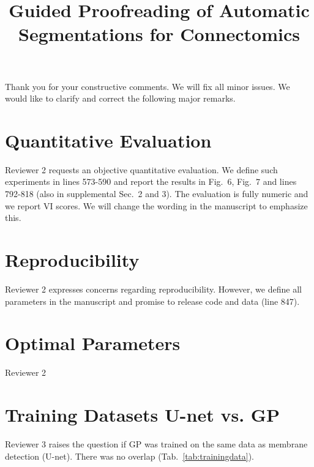 \documentclass[10pt,twocolumn,letterpaper]{article}
\begin{document}
\title{Guided Proofreading of Automatic Segmentations for Connectomics}  %

\maketitle
\thispagestyle{empty}

Thank you for your constructive comments. We will fix all minor issues. We would like to clarify and correct the following major remarks.

\section{Quantitative Evaluation}
Reviewer 2 requests an objective quantitative evaluation. We define such experiments in lines 573-590 and report the results in Fig.~6, Fig.~7 and lines 792-818 (also in supplemental Sec.~2 and 3). The evaluation is fully numeric and we report VI scores. We will change the wording in the manuscript to emphasize this.

\section{Reproducibility}
Reviewer 2 expresses concerns regarding reproducibility. However, we define all parameters in the manuscript and promise to release code and data (line 847).

\section{Optimal Parameters}
Reviewer 2 


\section{Training Datasets U-net vs. GP}
Reviewer 3 raises the question if GP was trained on the same data as membrane detection (U-net). There was no overlap (Tab.~\ref{tab:trainingdata}).
\end{document}
